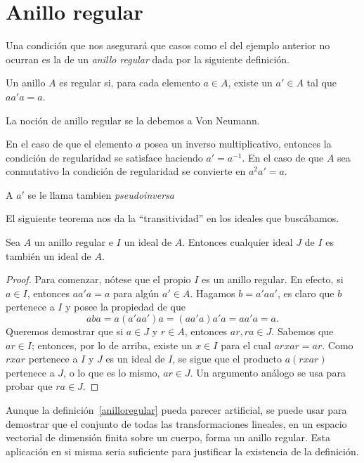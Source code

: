 \section{Anillo regular}
Una condición que nos asegurará que casos como el del ejemplo anterior no ocurran es la de un \textit{anillo regular} dada por la siguiente definición.

\begin{defi}\label{anilloregular} 
	Un anillo $A$ es regular si, para cada elemento $a\in A$, existe un $a'\in A$ tal que $aa'a=a$.
\end{defi}  
\begin{nota}
	La noción de anillo regular se la debemos a Von Neumann\footnotemark.
\end{nota}
En el caso de que el elemento $a$ posea un inverso multiplicativo, entonces la condición de regularidad se satisface haciendo $a' = a^{-1}$. En el caso de que $A$ sea conmutativo la condición de regularidad se convierte en $a^2a'=a$.
\begin{nota}
	A $a'$ se le llama tambien \textit{pseudoinversa}
\end{nota}
El siguiente teorema nos da la ``transitividad'' en los ideales que buscábamos.
\begin{teo} 
	Sea $A$ un anillo regular e $I$ un ideal de $A$. Entonces cualquier ideal $J$ de $I$ es también un ideal de $A$.
\end{teo} 
\begin{proof}
	Para comenzar, nótese que el propio $I$ es un anillo regular. En efecto, si $a\in I$, entonces $aa'a=a$ para algún $a'\in A$. Hagamos $b = a'aa'$, es claro que $b$ pertenece a $I$ y posee la propiedad de que
	\[ aba = a(a'aa')a = (aa'a)a'a = aa'a = a. \]
	Queremos demostrar que si $a\in J$ y $r\in A$, entonces $ar,ra\in J$. Sabemos que $ar\in I$; entonces, por lo de arriba, existe un $x\in I$ para el cual $arxar=ar$. Como $rxar$ pertenece a $I$ y $J$ es un ideal de $I$, se sigue que el producto $a(rxar)$ pertenece a $J$, o lo que es lo mismo, $ar\in J$. Un argumento análogo se usa para probar que $ra\in J$.
\end{proof}
Aunque la definición~\ref{anilloregular} pueda parecer artificial, se puede usar para demostrar que el conjunto de todas las transformaciones lineales, en un espacio vectorial de dimensión finita sobre un cuerpo, forma un anillo regular. Esta aplicación en si misma seria suficiente para justificar la existencia de la definición.
 

